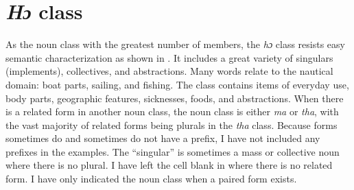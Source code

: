 \section{\textit{Hɔ} class}
\label{sec:5.7}\hypertarget{Toc115517794}{}
As the noun class with the greatest number of members, the \textit{hɔ} class resists easy semantic characterization as shown in . It includes a great variety of singulars (implements), collectives, and abstractions. Many words relate to the nautical domain: boat parts, sailing, and fishing. The class contains items of everyday use, body parts, geographic features, sicknesses, foods, and abstractions. When there is a related form in another noun class, the noun class is either \textit{ma} or \textit{tha}, with the vast majority of related forms being plurals in the \textit{tha} class. Because forms sometimes do and sometimes do not have a prefix, I have not included any prefixes in the examples. The “singular” is sometimes a mass or collective noun where there is no plural. I have left the cell blank in  where there is no related form. I have only indicated the noun class when a paired form exists.

